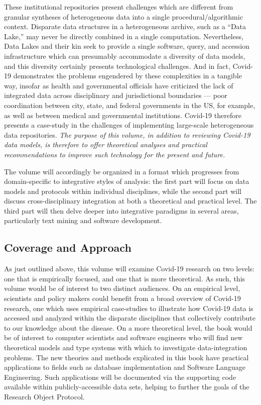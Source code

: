 \documentclass{statsoc}
\newcommand{\p}[1]{

\vspace{.75em}#1}
\newcommand{\q}[1]{{\fontfamily{qcr}\selectfont ``}#1{\fontfamily{qcr}\selectfont ''}}
\begin{document}
{\p{These institutional repositories present 
challenges which are different from granular 
syntheses of heterogeneous data into a single 
procedural/algorithmic context.  Disparate data structures 
in a heterogeneous archive, such as a \q{Data Lake,} may 
never be directly combined in a single computation.  
Nevertheless, Data Lakes and their kin seek to 
provide a single software, query, and accession infrastructure 
which can presumably accommodate a diversity of data models, and 
this diversity certainly presents technological challenges.  
And in fact, Covid-19 demonstrates the problems 
engendered by these complexities in a tangible way, 
insofar as health and governmental officials have criticized 
the lack of integrated data across disciplinary and 
jurisdictional boundaries --- poor coordination between 
city, state, and federal governments in the US, for 
example, as well as between medical and governmental institutions.  
Covid-19 therefore presents a case-study in the challenges 
of implementing large-scale heterogeneous data repositories.  
\textit{The purpose of this volume, in addition to 
reviewing Covid-19 data models, is therefore to offer theoretical analyses 
and practical recommendations to improve such 
technology for the present and future.}} 

\p{The volume will accordingly be organized in a 
format which progresses from domain-specific to integrative 
styles of analysis: the first part will focus on data 
models and protocols within individual disciplines, 
while the second part will discuss 
cross-disciplinary integration at both a theoretical and 
practical level.  The third part will then delve deeper 
into integrative paradigms in several areas, particularly 
text mining and software development.}  

\subsection{Coverage and Approach}

\p{As just outlined above, this volume will examine 
Covid-19 research on two levels: one that is  
empirically focused, and one that is more theoretical.  As 
such, this volume would be of interest 
to two distinct audiences.  On an empirical level, 
scientists and policy makers could benefit 
from a broad overview of Covid-19 research, 
one which uses empirical case-studies to 
illustrate how Covid-19 data is accessed and 
analyzed within the disparate disciplines that 
collectively contribute to our knowledge 
about the disease.  On a more theoretical 
level, the book would be of interest to 
computer scientists and software engineers 
who will find new theoretical models and 
type systems with which to investigate 
data-integration problems.  The new 
theories and methods explicated in this book have practical 
applications to fields such as database implementation and 
Software Language Engineering.  Such applications will be 
documented via the supporting code available 
within publicly-accessible data sets, helping 
to further the goals of the Research Object Protocol.}

}
\end{document}
